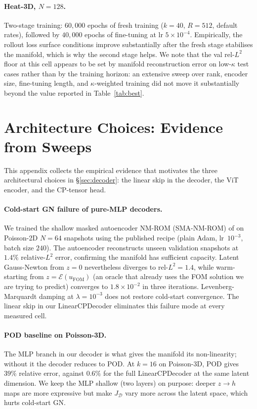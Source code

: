 \documentclass{article}
\begin{document}
\paragraph{Heat-3D, $N{=}128$.}
Two-stage training: $60{,}000$ epochs of fresh training ($k{=}40$,
$R{=}512$, default rates), followed by $40{,}000$ epochs of
fine-tuning at lr $5\times10^{-4}$. Empirically, the rollout loss
surface conditions improve substantially after the fresh stage
stabilises the manifold, which is why the second stage helps. We
note that the val rel-$L^2$ floor at this cell appears to be set by
manifold reconstruction error on low-$\kappa$ test cases rather than
by the training horizon: an extensive sweep over rank, encoder size,
fine-tuning length, and $\kappa$-weighted training did not move it
substantially beyond the value reported in Table~\ref{tab:best}.

\section{Architecture Choices: Evidence from Sweeps}
\label{app:architecture-evidence}

This appendix collects the empirical evidence that motivates the three
architectural choices in \S\ref{sec:decoder}: the linear skip in the
decoder, the ViT encoder, and the CP-tensor head.

\paragraph{Cold-start GN failure of pure-MLP decoders.}
We trained the shallow masked autoencoder NM-ROM (SMA-NM-ROM) of
\citet{KimChoi2022NMROM} on Poisson-2D $N{=}64$ snapshots using the
published recipe (plain Adam, lr~$10^{-3}$, batch size $240$). The
autoencoder reconstructs unseen validation snapshots at $1.4\%$
relative-$L^2$ error, confirming the manifold has sufficient capacity.
Latent Gauss-Newton from $z = 0$ nevertheless diverges to
$\mathrm{rel}\textrm{-}L^2 = 1.4$, while warm-starting from
$z = \mathcal{E}(u_\mathrm{FOM})$ (an oracle that already uses the FOM
solution we are trying to predict) converges to
$1.8\times 10^{-2}$ in three iterations. Levenberg-Marquardt damping
at $\lambda = 10^{-3}$ does not restore cold-start convergence. The
linear skip in our LinearCPDecoder eliminates this failure mode at
every measured cell.

\paragraph{POD baseline on Poisson-3D.}
The MLP branch in our decoder is what gives the manifold its
non-linearity; without it the decoder reduces to POD. At $k = 16$ on
Poisson-3D, POD gives $39\%$ relative error, against $0.6\%$ for the
full LinearCPDecoder at the same latent dimension. We keep the MLP
shallow (two layers) on purpose: deeper $z \to h$ maps are more
expressive but make $J_\mathcal{D}$ vary more across the latent space,
which hurts cold-start GN.
\end{document}
